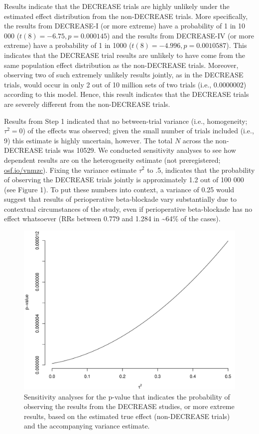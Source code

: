 \documentclass[]{article}
\begin{document}
Results indicate that the DECREASE trials are highly unlikely under the
estimated effect distribution from the non-DECREASE trials. More
specifically, the results from DECREASE-I (or more extreme) have a
probability of 1 in 10 000 (\(t(8)=-6.75,p=0.000145\)) and the results
from DECREASE-IV (or more extreme) have a probability of 1 in 1000
(\(t(8)=-4.996,p=0.0010587\)). This indicates that the DECREASE trial
results are unlikely to have come from the same population effect
distribution as the non-DECREASE trials. Moreover, observing two of such
extremely unlikely results jointly, as in the DECREASE trials, would
occur in only 2 out of 10 million sets of two trials (i.e.,
\(0.0000002\)) according to this model. Hence, this result indicates
that the DECREASE trials are severely different from the non-DECREASE
trials.

Results from Step 1 indicated that no between-trial variance (i.e.,
homogeneity; \(\tau^2=0\)) of the effects was observed; given the small
number of trials included (i.e., 9) this estimate is highly uncertain,
however. The total \(N\) across the non-DECREASE trials was 10529. We
conducted sensitivity analyses to see how dependent results are on the
heterogeneity estimate (not preregistered;
\href{https://osf.io/vnmzc}{osf.io/vnmzc}). Fixing the variance estimate
\(\tau^2\) to .5, indicates that the probability of observing the
DECREASE trials jointly is approximately 1.2 out of 100 000 (see Figure
1). To put these numbers into context, a variance of 0.25 would suggest
that results of perioperative beta-blockade vary substantially due to
contextual circumstances of the study, even if perioperative
beta-blockade has no effect whatsoever (RRs between 0.779 and 1.284 in
\textasciitilde{}64\% of the cases).

\begin{figure}

{\centering \includegraphics[width=0.8\linewidth]{../figures/fig1} 

}

\caption{Sensitivity analyses for the p-value that indicates the probability of observing the results from the DECREASE studies, or more extreme results, based on the estimated true effect (non-DECREASE trials) and the accompanying variance estimate.}\label{fig:figure 2}
\end{figure}
\end{document}

